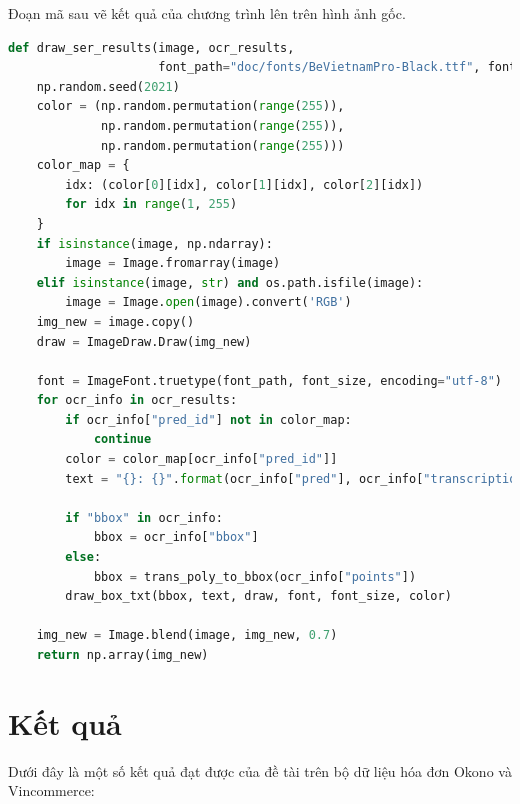 Đoạn mã sau vẽ kết quả của chương trình lên trên hình ảnh gốc.
\begin{lstlisting}[language=Python]
def draw_ser_results(image, ocr_results, 
                     font_path="doc/fonts/BeVietnamPro-Black.ttf", font_size=14):
    np.random.seed(2021)
    color = (np.random.permutation(range(255)),
             np.random.permutation(range(255)),
             np.random.permutation(range(255)))
    color_map = {
        idx: (color[0][idx], color[1][idx], color[2][idx])
        for idx in range(1, 255)
    }
    if isinstance(image, np.ndarray):
        image = Image.fromarray(image)
    elif isinstance(image, str) and os.path.isfile(image):
        image = Image.open(image).convert('RGB')
    img_new = image.copy()
    draw = ImageDraw.Draw(img_new)

    font = ImageFont.truetype(font_path, font_size, encoding="utf-8")
    for ocr_info in ocr_results:
        if ocr_info["pred_id"] not in color_map:
            continue
        color = color_map[ocr_info["pred_id"]]
        text = "{}: {}".format(ocr_info["pred"], ocr_info["transcription"])

        if "bbox" in ocr_info:
            bbox = ocr_info["bbox"]
        else:
            bbox = trans_poly_to_bbox(ocr_info["points"])
        draw_box_txt(bbox, text, draw, font, font_size, color)

    img_new = Image.blend(image, img_new, 0.7)
    return np.array(img_new)    
\end{lstlisting}

\newpage
\section{Kết quả}
Dưới đây là một số kết quả đạt được của đề tài trên bộ dữ liệu hóa đơn Okono và Vincommerce:
